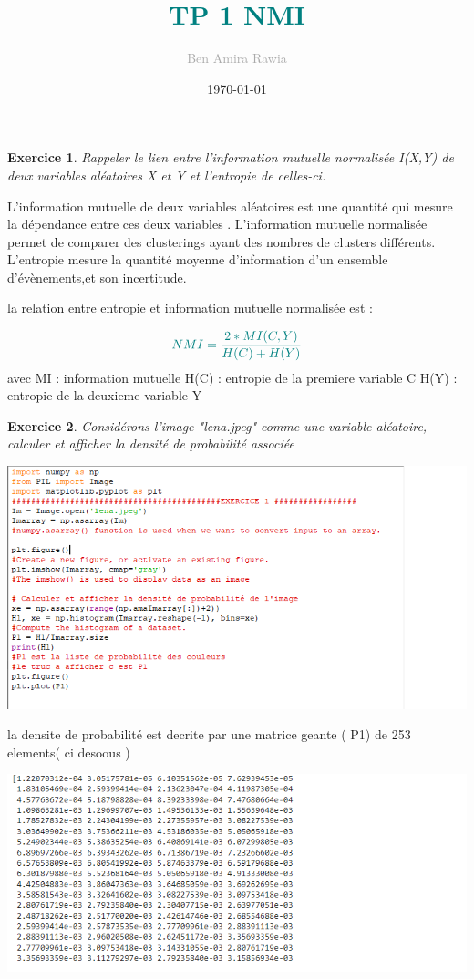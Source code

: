 \documentclass[a4paper,10pt]{scrartcl}
\title{\textcolor{teal}{TP 1 NMI}}
\author{\textcolor{darkgray}{Ben Amira Rawia}}
\date{\today}
\theoremstyle{plain}
\newtheorem{exo}{Exercice}
\begin{document}
\maketitle
\newpage

\begin{exo}
 Rappeler le lien entre l'information mutuelle normalisée I(X,Y) de deux variables aléatoires X et Y et l'entropie de celles-ci.
\end{exo}
L'information mutuelle de deux variables aléatoires est une quantité qui mesure la dépendance entre ces deux variables .
L'information mutuelle normalisée permet de comparer des clusterings ayant des nombres de clusters différents.
L'entropie mesure la quantité moyenne d’information d’un ensemble d’évènements,et son incertitude.

la relation entre entropie et information mutuelle normalisée est : 

\[
\textcolor{teal}{ NMI = \frac{2*MI(C,Y)}{H(C)+H(Y)}}
\]
avec MI : information mutuelle
H(C) : entropie de la premiere variable C
H(Y) : entropie de la deuxieme variable Y 

\begin{exo}
Considérons l'image "lena.jpeg" comme une variable aléatoire, calculer et afficher la densité de probabilité associée
\end{exo}

\centerline{\includegraphics[width=18cm]{hello.png}}

la densite de probabilité est decrite par une matrice geante ( P1)  de 253 elements( ci desoous )

\centerline{\includegraphics[width=18cm]{p1.png}}
\end{document}
